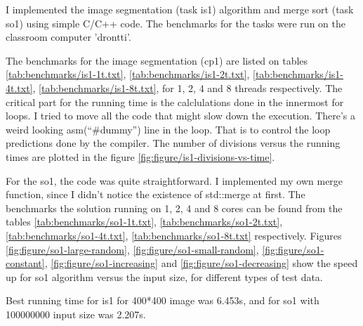 I implemented the image segmentation (task is1) algorithm and merge sort (task so1) using simple C/C++ code. The benchmarks for the tasks were run on the classroom computer 'drontti'.

The benchmarks for the image segmentation (cp1) are listed on tables \ref{tab:benchmarks/is1-1t.txt}, \ref{tab:benchmarks/is1-2t.txt}, \ref{tab:benchmarks/is1-4t.txt},  \ref{tab:benchmarks/is1-8t.txt}, for 1, 2, 4 and 8 threads respectively. The critical part for the running time is the calclulations done in the innermost for loops. I tried to move all the code that might slow down the execution. There's a weird looking asm(``\#dummy'') line in the loop. That is to control the loop predictions done by the compiler. The number of divisions versus the running times are plotted in the figure \ref{fig:figure/is1-divisions-vs-time}.

For the so1, the code was quite straightforward. I implemented my own merge function, since I didn't notice the existence of std::merge at first. The benchmarks the solution running on 1, 2, 4 and 8 cores can be found from the tables \ref{tab:benchmarks/so1-1t.txt}, \ref{tab:benchmarks/so1-2t.txt}, \ref{tab:benchmarks/so1-4t.txt}, \ref{tab:benchmarks/so1-8t.txt} respectively. Figures \ref{fig:figure/so1-large-random}, \ref{fig:figure/so1-small-random}, \ref{fig:figure/so1-constant}, \ref{fig:figure/so1-increasing} and \ref{fig:figure/so1-decreasing} show the speed up for so1 algorithm versus the input size, for different types of test data.

Best running time for is1 for 400*400 image was 6.453s, and for so1 with 100000000 input size was 2.207s.

